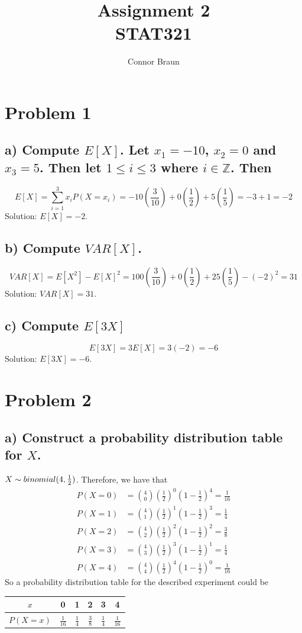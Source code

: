 \documentclass[11pt, letterpaper]{article}
\begin{document}
\title{Assignment 2\\\normalsize STAT321}
\author{Connor Braun}

\allowdisplaybreaks

\maketitle

\section*{Problem 1}
\subsection*{a) \normalfont Compute $E[X]$. Let $x_1=-10$, $x_2=0$ and $x_3=5$. Then let $1\leq i\leq 3$ where $i\in \mathbb{Z}$. Then}
\[E[X]=\sum_{i=1}^{3}x_iP(X=x_i)=-10(\frac{3}{10})+0(\frac{1}{2})+5(\frac{1}{5})=-3+1=-2\]
Solution: $E[X]=-2$.
\subsection*{b) \normalfont Compute $VAR[X]$.}
\[VAR[X]=E[X^2]-E[X]^2=100(\frac{3}{10})+0(\frac{1}{2})+25(\frac{1}{5})-(-2)^2=31\]
Solution: $VAR[X]=31$.
\subsection*{c) \normalfont Compute $E[3X]$}
\[E[3X]=3E[X]=3(-2)=-6\]
Solution: $E[3X]=-6$.

\section*{Problem 2}
\subsection*{a) \normalfont Construct a probability distribution table for $X$.}
$X\sim binomial(4,\space \frac{1}{2})$. Therefore, we have that
\begin{align*}
    P(X=0)&={4\choose 0}(\frac{1}{2})^0(1-\frac{1}{2})^4=\frac{1}{16}\\
    P(X=1)&={4\choose 1}(\frac{1}{2})^1(1-\frac{1}{2})^3=\frac{1}{4}\\
    P(X=2)&={4\choose 2}(\frac{1}{2})^2(1-\frac{1}{2})^2=\frac{3}{8}\\
    P(X=3)&={4\choose 3}(\frac{1}{2})^3(1-\frac{1}{2})^1=\frac{1}{4}\\
    P(X=4)&={4\choose 4}(\frac{1}{2})^4(1-\frac{1}{2})^0=\frac{1}{16}
\end{align*}
So a probability distribution table for the described experiment could be 
\begin{table}[h!]
    \begin{center}
        \begin{tabular}{c|c|c|c|c|c}
            $x$ & 0 & 1 & 2 & 3 & 4\\
            \hline
            $P(X=x)$ & $\frac{1}{16}$ & $\frac{1}{4}$ & $\frac{3}{8}$ & $\frac{1}{4}$ & $\frac{1}{16}$
        \end{tabular}
    \end{center}
\end{table}
\end{document}
